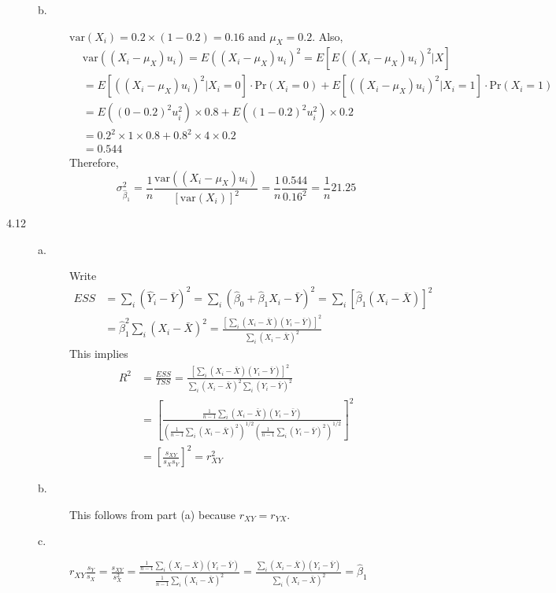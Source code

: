 \documentclass[a4paper,11pt]{article}
\newcommand{\var}{\mathrm{var}}
\newcommand{\pr}{\mathrm{Pr}}
\begin{document}
\begin{description}
\begin{description}
\item[{b.}] \(\var(X_i) = 0.2 \times (1-0.2) = 0.16 \text{ and } \mu_X =
          0.2\). Also,
\begin{equation*}
\begin{split}
&\var\left((X_i - \mu_X)u_i\right) = E\left((X_i - \mu_X)u_i\right)^2 = E\left[E\left((X_i - \mu_X)u_i\right)^2|X\right] \\
&= E\left[\left((X_i - \mu_X)u_i\right)^2|X_i = 0\right]\cdot\pr(X_i = 0) + E\left[\left((X_i - \mu_X)u_i\right)^2|X_i = 1\right]\cdot\pr(X_i = 1) \\
&= E((0-0.2)^2 u_i^2) \times 0.8 + E((1-0.2)^2 u_i^2) \times 0.2 \\
&= 0.2^2 \times 1 \times 0.8 + 0.8^2 \times 4 \times 0.2 \\
&= 0.544
\end{split}
\end{equation*}
Therefore,
\[ \sigma^{2}_{\hat{\beta}_1} = \frac{1}{n}\frac{\var\left(
          (X_i - \mu_X)u_i\right)}{\left[\var(X_i)\right]^2} =
          \frac{1}{n}\frac{0.544}{0.16^2} = \frac{1}{n}21.25 \]
\end{description}

\item[{4.12}] \begin{description}
\item[{a.}] Write
\begin{equation*}
\begin{split}
 ESS &= \sum_i (\hat{Y}_i - \bar{Y})^2 = \sum_i (\hat{\beta}_0 + \hat{\beta}_1 X_i - \bar{Y})^2 = \sum_i \left[\hat{\beta}_1(X_i-\bar{X})\right]^2 \\
 &= \hat{\beta}_1^2 \sum_i (X_i - \bar{X})^2 = \frac{\left[\sum_i (X_i-\bar{X})(Y_i-\bar{Y})\right]^2}{\sum_i (X_i-\bar{X})^2}
\end{split}
\end{equation*}
This implies
\begin{equation*}
 \begin{split}
  R^2 &= \frac{ESS}{TSS} = \frac{\left[\sum_i (X_i-\bar{X})(Y_i-\bar{Y})\right]^2}{\sum_i (X_i-\bar{X})^2\sum_i (Y_i-\bar{Y})^2} \\
  &= \left[\frac{\frac{1}{n-1}\sum_i (X_i-\bar{X})(Y_i-\bar{Y})}{\left(\frac{1}{n-1}\sum_i (X_i-\bar{X})^2\right)^{1/2}\left(\frac{1}{n-1}\sum_i (Y_i-\bar{Y})^2\right)^{1/2}}\right]^2 \\
  &= \left[\frac{s_{XY}}{s_X s_Y} \right]^2 = r^2_{XY}
 \end{split}
\end{equation*}

\item[{b.}] This follows from part (a) because \(r_{XY} = r_{YX}\).
\item[{c.}] \(r_{XY}\frac{s_Y}{s_X} = \frac{s_{XY}}{s^2_X} =
          \frac{\frac{1}{n-1}\sum_i(X_i-\bar{X})(Y_i-\bar{Y})}{\frac{1}{n-1}\sum_i(X_i-\bar{X})^2}
          = \frac{\sum_i(X_i-\bar{X})(Y_i-\bar{Y})}{\sum_i(X_i-\bar{X})^2}=\hat{\beta}_1\)
\end{description}
\end{description}
\end{document}
